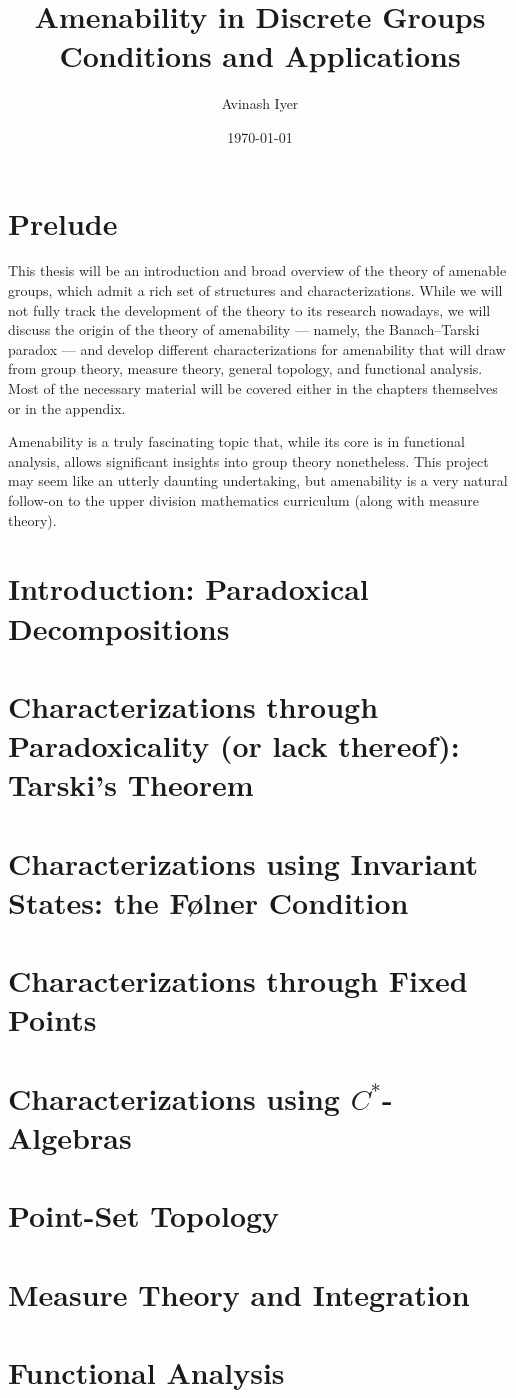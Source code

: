 \documentclass[10pt]{package2}
\title{Amenability in Discrete Groups\\ {\large Conditions and Applications}}
\author{Avinash Iyer}
\date{\today}
\newcommand{\1}{\mathds{1}}
\begin{document}
\maketitle
\RaggedRight
\tableofcontents
\chapter{Prelude}
This thesis will be an introduction and broad overview of the theory of amenable groups, which admit a rich set of structures and characterizations. While we will not fully track the development of the theory to its research nowadays, we will discuss the origin of the theory of amenability --- namely, the Banach--Tarski paradox --- and develop different characterizations for amenability that will draw from group theory, measure theory, general topology, and functional analysis. Most of the necessary material will be covered either in the chapters themselves or in the appendix.\newline

Amenability is a truly fascinating topic that, while its core is in functional analysis, allows significant insights into group theory nonetheless. This project may seem like an utterly daunting undertaking, but amenability is a very natural follow-on to the upper division mathematics curriculum (along with measure theory).
\chapter{Introduction: Paradoxical Decompositions}

\chapter{Characterizations through Paradoxicality (or lack thereof): Tarski's Theorem}

\chapter{Characterizations using Invariant States: the Følner Condition}

\chapter{Characterizations through Fixed Points}
\chapter{Characterizations using $C^{\ast}$-Algebras}
\appendix
\chapter{Point-Set Topology}

\chapter{Measure Theory and Integration}

\chapter{Functional Analysis}
\nocite{*}
\printbibliography
\end{document}
